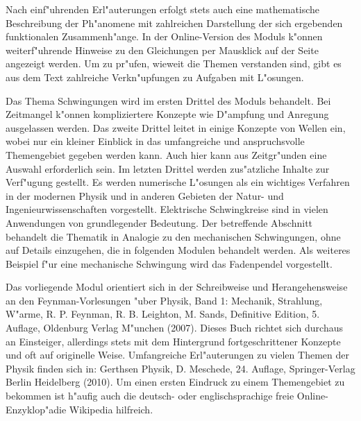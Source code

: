 \begin{MSectionStart}
Nach einf"uhrenden Erl"auterungen erfolgt stets auch eine mathematische Beschreibung der Ph"anomene mit zahlreichen Darstellung der sich ergebenden funktionalen Zusammenh"ange. In der Online-Version des Moduls k"onnen weiterf"uhrende Hinweise zu den Gleichungen per Mausklick auf der Seite angezeigt werden. Um zu pr"ufen, wieweit die Themen verstanden sind, gibt es aus dem Text zahlreiche Verkn"upfungen zu Aufgaben mit L"osungen. 

Das Thema Schwingungen wird im ersten Drittel des Moduls behandelt. Bei Zeitmangel k"onnen kompliziertere Konzepte wie D"ampfung und Anregung ausgelassen werden. Das zweite Drittel leitet in einige Konzepte von Wellen ein, wobei nur ein kleiner Einblick in das umfangreiche und anspruchsvolle Themengebiet gegeben werden kann. Auch hier kann aus Zeitgr"unden eine Auswahl erforderlich sein. Im letzten Drittel werden zus"atzliche Inhalte zur Verf"ugung gestellt. Es werden numerische L"osungen als ein wichtiges Verfahren in der modernen Physik und in anderen Gebieten der Natur- und Ingenieurwissenschaften vorgestellt. Elektrische Schwingkreise sind in vielen Anwendungen von grundlegender Bedeutung. Der betreffende Abschnitt behandelt die Thematik in Analogie zu den mechanischen Schwingungen, ohne auf Details einzugehen, die in folgenden Modulen behandelt werden. Als weiteres Beispiel f"ur eine mechanische Schwingung wird das Fadenpendel vorgestellt.

Das vorliegende Modul orientiert sich in der Schreibweise und Herangehensweise an den Feynman-Vorlesungen "uber Physik, Band 1: Mechanik, Strahlung, W"arme, R. P. Feynman, R. B. Leighton, M. Sands, Definitive Edition, 5. Auflage, Oldenburg Verlag M"unchen (2007). Dieses Buch richtet sich durchaus an Einsteiger, allerdings stets mit dem Hintergrund fortgeschrittener Konzepte und oft auf originelle Weise.
Umfangreiche Erl"auterungen zu vielen Themen der Physik finden sich in: Gerthsen Physik, D. Meschede, 24. Auflage, Springer-Verlag Berlin Heidelberg (2010).
Um einen ersten Eindruck zu einem Themengebiet zu bekommen ist h"aufig auch die deutsch- oder englischsprachige freie Online-Enzyklop"adie Wikipedia hilfreich.


\end{MSectionStart}
